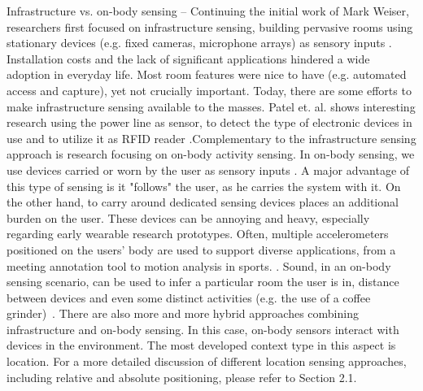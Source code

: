 \begin{description}
 \item{Infrastructure vs. on-body sensing} -- 
Continuing the initial work of Mark Weiser, researchers
first focused on infrastructure sensing, building pervasive
rooms using stationary devices (e.g. fixed cameras, microphone arrays) as sensory inputs \cite{Dimakis:jr,Pentland:1996wt}.
Installation costs and the lack of significant applications 
hindered a wide adoption in everyday life. Most room features
were nice to have (e.g. automated access and capture), yet not crucially important.
Today, there are some efforts to make infrastructure sensing available
to the masses. Patel et. al. shows interesting research using the power line
as sensor, to detect the type of electronic devices in use and to utilize it as RFID reader \cite{Patel:2007vxa,Patel:2009bi}.Complementary to the infrastructure sensing approach is research focusing on on-body activity sensing. In on-body sensing, we use devices carried or worn by the user as sensory inputs
\cite{bao2003physical}. A major advantage of this type of sensing is it "follows" the user, as he carries the system with it. On the other hand, to carry around dedicated
sensing devices places an additional burden on the user. These devices can be annoying and heavy, especially regarding early wearable research prototypes.
Often, multiple accelerometers positioned on the users' body are used to support diverse applications, from a
meeting annotation tool to motion analysis in sports.
\cite{kern2003multi,mantyjarvi2001recognizing,ZHANG:2004wa}. Sound, in an on-body sensing scenario, can be used to infer a particular room the user is in, distance between devices and even some distinct activities (e.g. the use of a coffee grinder)~\cite{Stager:2007wm,Wyatt:2007ta}. 
There are also more and more hybrid approaches combining infrastructure and on-body sensing. In this case, on-body sensors interact with devices in the environment. The most developed context type in this aspect is location. For a more detailed discussion of different location sensing approaches, including relative and absolute positioning, please refer to Section 2.1. 


\end{description}
